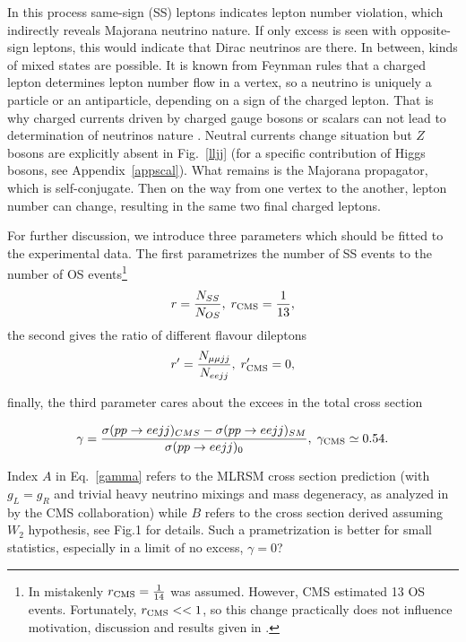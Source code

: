\documentclass[twocolumn,superscriptaddress,showpacs,prl,nofootinbib,floatfix]{revtex4}
\begin{document}
In this process same-sign (SS) leptons indicates lepton number violation, which indirectly reveals Majorana neutrino nature. If only excess is seen with opposite-sign leptons, this would indicate that Dirac neutrinos are there. In between, 
kinds of mixed states are possible. It is known from Feynman rules \cite{Gluza:1991wj,Denner:1992me} that a charged lepton determines lepton number flow in a vertex, so a neutrino is uniquely a particle or an antiparticle, depending on a sign of the charged lepton. That is why charged currents driven by charged gauge bosons or scalars can not lead to determination of neutrinos nature \cite{Gluza:1991wj}.  Neutral currents change situation but  $Z$ bosons are explicitly absent in Fig.~\ref{lljj} (for a specific contribution of Higgs bosons, see Appendix~\ref{appscal}). What remains is the Majorana propagator, which is self-conjugate.  Then on the way from one vertex to the another, 
lepton number can change, resulting in the same two final charged leptons.  

For further discussion, we  introduce three  parameters which should be fitted to the experimental data. The first parametrizes  the number of SS events  to the number of OS events\footnote{In \cite{Gluza:2015goa} mistakenly $r_{\rm{CMS}}=\frac{1}{14}$ was assumed. However, CMS estimated 13 OS events. Fortunately,  $r_{\rm{CMS}}<<1$, so this change practically does not influence  motivation, discussion and results given in \cite{Gluza:2015goa}.} 
\begin{equation}
r=\frac{ N_{SS}}{ N_{OS}},\; r_{\rm{CMS}}=\frac {1}{ 13},\label{r}
\end{equation}
 the second gives the ratio of different flavour dileptons
 \begin{equation}
r'=\frac{ N_{\mu \mu jj}}{ N_{eejj}}\label{rp},\;r'_{\rm{CMS}}=0,
\end{equation}

finally, the third parameter cares about the excees in the total cross section

\begin{equation}
\gamma=\frac{\sigma(pp\to eejj)_{CMS}-\sigma(pp\to eejj)_{SM}}{\sigma(pp\to eejj)_{0}} , \; \gamma_{\rm{CMS}}\simeq 0.54.
 \label{gamma}
\end{equation}

Index $A$ in Eq.~\ref{gamma} refers to the MLRSM cross section prediction (with $g_L =g_R$ and trivial heavy neutrino mixings and mass degeneracy, as analyzed in by the CMS collaboration)    
while $B$ refers to the cross section derived assuming $W_2$ hypothesis, see  Fig.1 for details. Such a prametrization is better for small statistics, especially in a limit of no excess, $\gamma=0$? 
 
\end{document}
